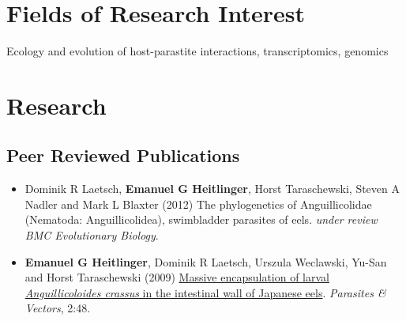 \section*{Fields of Research Interest}

Ecology and evolution of host-parastite interactions, transcriptomics, genomics

\section*{Research}

\subsection*{Peer Reviewed Publications}

\begin{itemize}
\item Dominik R Laetsch, \textbf{Emanuel G Heitlinger}, Horst
  Taraschewski, Steven A Nadler and Mark L Blaxter (2012) The
  phylogenetics of Anguillicolidae (Nematoda: Anguillicolidea),
  swimbladder parasites of eels. \textit{under review} \textit{BMC
    Evolutionary Biology}.
\item \textbf{Emanuel G Heitlinger}, Dominik R Laetsch, Urszula Weclawski,
  Yu-San and Horst Taraschewski (2009)
  \href{http://www.parasitesandvectors.com/content/2/1/48}{Massive
    encapsulation of larval \textit{Anguillicoloides crassus} in the
    intestinal wall of Japanese eels}. \textit{Parasites \& Vectors},
  2:48.
\end{itemize}

%




